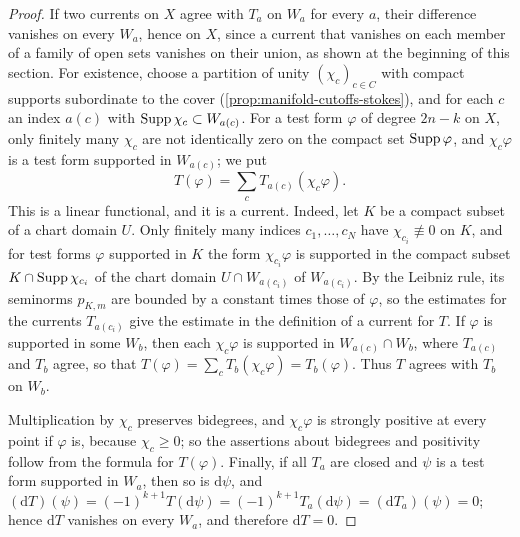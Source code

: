 \begin{proof}
If two currents on $X$ agree with $T_a$ on $W_a$ for every $a$, their difference vanishes on every $W_a$, hence on $X$, since a current that vanishes on each member of a family of open sets vanishes on their union, as shown at the beginning of this section. For existence, choose a partition of unity $(\chi_c)_{c\in C}$ with compact supports subordinate to the cover (\cref{prop:manifold-cutoffs-stokes}), and for each $c$ an index $a(c)$ with $\operatorname{Supp}\chi_c\subset W_{a(c)}$. For a test form $\varphi$ of degree $2n-k$ on $X$, only finitely many $\chi_c$ are not identically zero on the compact set $\operatorname{Supp}\varphi$, and $\chi_c\varphi$ is a test form supported in $W_{a(c)}$; we put
\[
 T(\varphi)=\sum_cT_{a(c)}(\chi_c\varphi).
\]
This is a linear functional, and it is a current. Indeed, let $K$ be a compact subset of a chart domain $U$. Only finitely many indices $c_1,\ldots,c_N$ have $\chi_{c_i}\not\equiv0$ on $K$, and for test forms $\varphi$ supported in $K$ the form $\chi_{c_i}\varphi$ is supported in the compact subset $K\cap\operatorname{Supp}\chi_{c_i}$ of the chart domain $U\cap W_{a(c_i)}$ of $W_{a(c_i)}$. By the Leibniz rule, its seminorms $p_{K,m}$ are bounded by a constant times those of $\varphi$, so the estimates for the currents $T_{a(c_i)}$ give the estimate in the definition of a current for $T$. If $\varphi$ is supported in some $W_b$, then each $\chi_c\varphi$ is supported in $W_{a(c)}\cap W_b$, where $T_{a(c)}$ and $T_b$ agree, so that $T(\varphi)=\sum_cT_b(\chi_c\varphi)=T_b(\varphi)$. Thus $T$ agrees with $T_b$ on $W_b$.

Multiplication by $\chi_c$ preserves bidegrees, and $\chi_c\varphi$ is strongly positive at every point if $\varphi$ is, because $\chi_c\geq0$; so the assertions about bidegrees and positivity follow from the formula for $T(\varphi)$. Finally, if all $T_a$ are closed and $\psi$ is a test form supported in $W_a$, then so is $\mathrm d\psi$, and $(\mathrm dT)(\psi)=(-1)^{k+1}T(\mathrm d\psi)=(-1)^{k+1}T_a(\mathrm d\psi)=(\mathrm dT_a)(\psi)=0$; hence $\mathrm dT$ vanishes on every $W_a$, and therefore $\mathrm dT=0$.
\end{proof}

